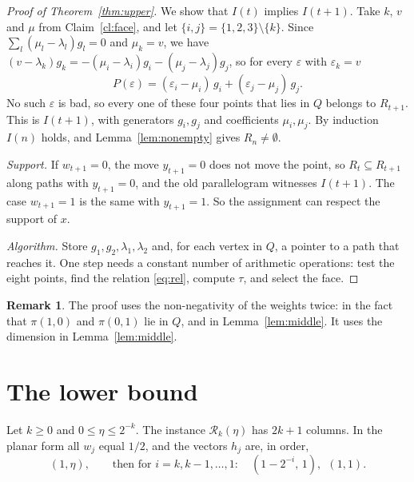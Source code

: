 \documentclass[11pt]{article}
\theoremstyle{definition}
\newtheorem{remark}[theorem]{Remark}
\newcommand{\eps}{\varepsilon}
\begin{document}
\begin{proof}[Proof of Theorem~\ref{thm:upper}]
We show that $I(t)$ implies $I(t+1)$.  Take $k$, $v$ and $\mu$ from
Claim~\ref{cl:face}, and let $\{i,j\}=\{1,2,3\}\setminus\{k\}$.  Since
$\sum_l(\mu_l-\lambda_l)g_l=0$ and $\mu_k=v$, we have
$(v-\lambda_k)g_k=-(\mu_i-\lambda_i)g_i-(\mu_j-\lambda_j)g_j$, so for
every $\eps$ with $\eps_k=v$
\[
 P(\eps)=(\eps_i-\mu_i)\,g_i+(\eps_j-\mu_j)\,g_j .
\]
No such $\eps$ is bad, so every one of these four points that lies in $Q$
belongs to $R_{t+1}$.  This is $I(t+1)$, with generators $g_i,g_j$ and
coefficients $\mu_i,\mu_j$.  By induction $I(n)$ holds, and
Lemma~\ref{lem:nonempty} gives $R_n\ne\emptyset$.

\emph{Support.}  If $w_{t+1}=0$, the move $y_{t+1}=0$ does not move the
point, so $R_t\subseteq R_{t+1}$ along paths with $y_{t+1}=0$, and the old
parallelogram witnesses $I(t+1)$.  The case $w_{t+1}=1$ is the same with
$y_{t+1}=1$.  So the assignment can respect the support of $x$.

\emph{Algorithm.}  Store $g_1,g_2,\lambda_1,\lambda_2$ and, for each
vertex in $Q$, a pointer to a path that reaches it.  One step needs a
constant number of arithmetic operations: test the eight points, find the
relation \eqref{eq:rel}, compute $\tau$, and select the face.
\end{proof}

\begin{remark}
The proof uses the non-negativity of the weights twice: in the fact that
$\pi(1,0)$ and $\pi(0,1)$ lie in $Q$, and in Lemma~\ref{lem:middle}.  It
uses the dimension in Lemma~\ref{lem:middle}.
\end{remark}

\section{The lower bound}\label{sec:lower}

Let $k\ge0$ and $0\le\eta\le2^{-k}$.  The instance $\mathcal R_k(\eta)$
has $2k+1$ columns.  In the planar form all $w_j$ equal $1/2$, and the
vectors $h_j$ are, in order,
\[
 (1,\eta),\qquad\text{then for } i=k,k-1,\dots,1:\quad (1-2^{-i},\,1),\ \ (1,1).
\]
\end{document}

